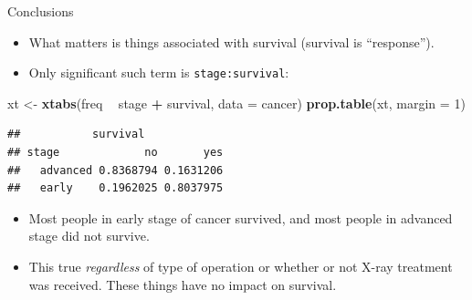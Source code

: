 \documentclass[ignorenonframetext,]{beamer}
\newenvironment{Shaded}{\begin{snugshade}}{\end{snugshade}}
\newcommand{\DataTypeTok}[1]{\textcolor[rgb]{0.13,0.29,0.53}{#1}}
\newcommand{\DecValTok}[1]{\textcolor[rgb]{0.00,0.00,0.81}{#1}}
\newcommand{\KeywordTok}[1]{\textcolor[rgb]{0.13,0.29,0.53}{\textbf{#1}}}
\newcommand{\NormalTok}[1]{#1}
\newcommand{\OperatorTok}[1]{\textcolor[rgb]{0.81,0.36,0.00}{\textbf{#1}}}
\newcommand{\StringTok}[1]{\textcolor[rgb]{0.31,0.60,0.02}{#1}}
\begin{document}
\begin{frame}[fragile]{Conclusions}
\protect\hypertarget{conclusions-4}{}

\begin{itemize}
\item
  What matters is things associated with survival (survival is
  ``response'').
\item
  Only significant such term is \texttt{stage:survival}:
\end{itemize}

\begin{Shaded}
\begin{Highlighting}[]
\NormalTok{xt <-}\StringTok{ }\KeywordTok{xtabs}\NormalTok{(freq }\OperatorTok{~}\StringTok{ }\NormalTok{stage }\OperatorTok{+}\StringTok{ }\NormalTok{survival, }\DataTypeTok{data =}\NormalTok{ cancer)}
\KeywordTok{prop.table}\NormalTok{(xt, }\DataTypeTok{margin =} \DecValTok{1}\NormalTok{)}
\end{Highlighting}
\end{Shaded}

\begin{verbatim}
##           survival
## stage             no       yes
##   advanced 0.8368794 0.1631206
##   early    0.1962025 0.8037975
\end{verbatim}

\begin{itemize}
\item
  Most people in early stage of cancer survived, and most people in
  advanced stage did not survive.
\item
  This true \emph{regardless} of type of operation or whether or not
  X-ray treatment was received. These things have no impact on survival.
\end{itemize}

\end{frame}
\end{document}
